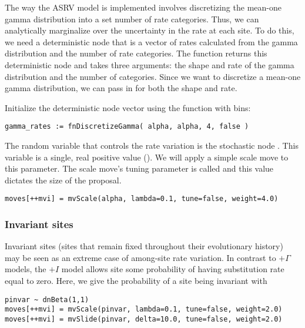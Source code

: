 The way the ASRV model is implemented involves discretizing the mean-one gamma distribution into a set number of rate categories. 
Thus, we can analytically marginalize over the uncertainty in the rate at each site. 
To do this, we need a deterministic node that is a vector of rates calculated from the gamma distribution and the number of rate categories. 
The  function returns this deterministic node and takes three arguments: the shape and rate of the gamma distribution and the number of categories. 
Since we want to discretize a mean-one gamma distribution, we can pass in  for both the shape and rate.

Initialize the  deterministic node vector using the   function with  bins:
{\tt \begin{snugshade*}
\begin{lstlisting}
gamma_rates := fnDiscretizeGamma( alpha, alpha, 4, false )
\end{lstlisting}
\end{snugshade*}}

The random variable that controls the rate variation is the stochastic node . 
This variable is a single, real positive value (). 
We will apply a simple scale move to this parameter.
The scale move's tuning parameter is called  and this value dictates the size of the proposal.
{\tt \begin{snugshade*}
\begin{lstlisting}
moves[++mvi] = mvScale(alpha, lambda=0.1, tune=false, weight=4.0)
\end{lstlisting}
\end{snugshade*}}

\subsubsection{Invariant sites}

Invariant sites (sites that remain fixed throughout their evolutionary history) may be seen as an extreme case of among-site rate variation.
In contrast to $+ \Gamma$ models, the $+I$ model allows site some probability of having substitution rate equal to zero.
Here, we give the probability of a site being invariant with 
{\tt \begin{snugshade*}
\begin{lstlisting}
pinvar ~ dnBeta(1,1)
moves[++mvi] = mvScale(pinvar, lambda=0.1, tune=false, weight=2.0)
moves[++mvi] = mvSlide(pinvar, delta=10.0, tune=false, weight=2.0)
\end{lstlisting}
\end{snugshade*}}



